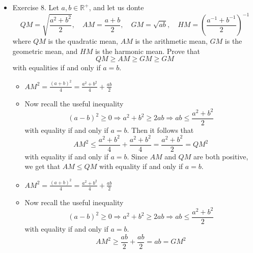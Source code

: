 \documentclass{article}
\begin{document}
\begin{itemize}
\begin{itemize}
\[        \]
        \item The above is equivalent to
        \[
        \vert x \vert \le \vert x-y \vert + \vert y \vert \qquad \wedge \qquad \vert y \vert \le \vert x-y \vert + \vert x \vert
        \]
        \item Take the first of these, which is
        \[
        \vert x \vert \le \vert x-y \vert + \vert y \vert
        \]
        \item Setting $u = x-y$ and $v = y$, we can use the usual triangle inequality, which states that for $u,v \in \mathbb{R}$,
        \[
        \vert u + v \vert \le \vert u \vert + \vert v \vert \Rightarrow \vert (x-y) + y \vert = \vert x \vert \le \vert x-y \vert + \vert y \vert
        \]
        \item Now setting $u = y-x$ and $v = x$, we get
        \[
        \vert (y-x) + x \vert = \vert y \vert \le \vert y - x \vert + \vert x \vert = \vert x-y \vert + \vert x \vert
        \]
    \end{itemize}
    \item Exercise 8. Let $a,b \in \mathbb{R}^+$, and let us donte
    \[
    QM = \sqrt{\frac{a^2+b^2}{2}}, \quad AM = \frac{a+b}{2}, \quad GM=\sqrt{ab}, \quad HM = \left( \frac{a^{-1}+b^{-1}}{2} \right)^{-1}
    \]
    where $QM$ is the quadratic mean, $AM$ is the arithmetic mean, $GM$ is the geometric mean, and $HM$ is the harmonic mean. Prove that
    \[
    QM \ge AM \ge GM \ge GM
    \]
    with equalities if and only if $a=b$.
    \begin{itemize}
        \item $AM^2 = \frac{(a+b)^2}{4} = \frac{a^2+b^2}{4} + \frac{ab}{2}$
        \item Now recall the useful inequality
        \[
        (a-b)^2 \ge 0 \Rightarrow a^2+b^2 \ge 2ab \Rightarrow ab \le \frac{a^2+b^2}{2}
        \]
        with equality if and only if $a=b$. Then it follows that
        \[
        AM^2 \le \frac{a^2+b^2}{4} + \frac{a^2+b^2}{4} = \frac{a^2+b^2}{2} = QM^2
        \]
        with equality if and only if $a=b$. Since $AM$ and $QM$ are both positive, we get that $AM \le QM$ with equality if and only if $a=b$.
        \item $AM^2 = \frac{(a+b)^2}{4} = \frac{a^2+b^2}{4} + \frac{ab}{2}$
        \item Now recall the useful inequality\[
        (a-b)^2 \ge 0 \Rightarrow a^2+b^2 \ge 2ab \Rightarrow ab \le \frac{a^2+b^2}{2}
        \]
        with equality if and only if $a=b$. 
        \[
        AM^2 \ge \frac{ab}{2} + \frac{ab}{2} = ab = GM^2
        \]
    \end{itemize}
\end{itemize}
\end{document}
